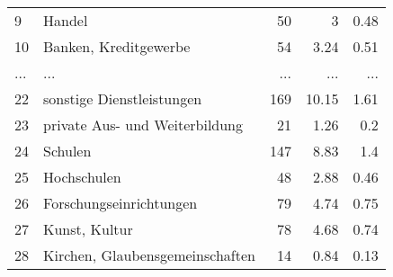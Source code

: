 \begin{longtable}{lXrrr}
        9 & \multicolumn{1}{X}{Handel} & %
          \num{50} &
          \num[round-mode=places,round-precision=2]{3} &
          \num[round-mode=places,round-precision=2]{0.48} \\
        10 & \multicolumn{1}{X}{Banken, Kreditgewerbe} & %
          \num{54} &
          \num[round-mode=places,round-precision=2]{3.24} &
          \num[round-mode=places,round-precision=2]{0.51} \\
       ... & ... & ... & ... & ... \\
        22 & \multicolumn{1}{X}{sonstige Dienstleistungen} & %
          \num{169} &
          \num[round-mode=places,round-precision=2]{10.15} &
          \num[round-mode=places,round-precision=2]{1.61} \\

        23 & \multicolumn{1}{X}{private Aus- und Weiterbildung} & %
          \num{21} &
          \num[round-mode=places,round-precision=2]{1.26} &
          \num[round-mode=places,round-precision=2]{0.2} \\

        24 & \multicolumn{1}{X}{Schulen} & %
          \num{147} &
          \num[round-mode=places,round-precision=2]{8.83} &
          \num[round-mode=places,round-precision=2]{1.4} \\

        25 & \multicolumn{1}{X}{Hochschulen} & %
          \num{48} &
          \num[round-mode=places,round-precision=2]{2.88} &
          \num[round-mode=places,round-precision=2]{0.46} \\

        26 & \multicolumn{1}{X}{Forschungseinrichtungen} & %
          \num{79} &
          \num[round-mode=places,round-precision=2]{4.74} &
          \num[round-mode=places,round-precision=2]{0.75} \\

        27 & \multicolumn{1}{X}{Kunst, Kultur} & %
          \num{78} &
          \num[round-mode=places,round-precision=2]{4.68} &
          \num[round-mode=places,round-precision=2]{0.74} \\

        28 & \multicolumn{1}{X}{Kirchen, Glaubensgemeinschaften} & %
          \num{14} &
          \num[round-mode=places,round-precision=2]{0.84} &
          \num[round-mode=places,round-precision=2]{0.13} \\


\end{longtable}

